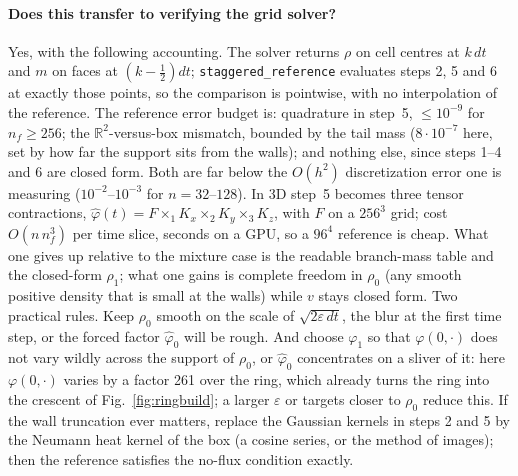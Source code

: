 \documentclass[11pt]{article}
\newcommand{\eps}{\varepsilon}
\newcommand{\code}[1]{\texttt{#1}}
\newcommand{\R}{\mathbb{R}}
\begin{document}
\paragraph{Does this transfer to verifying the grid solver?}
Yes, with the following accounting. The solver returns $\rho$ on cell centres at
$k\,dt$ and $m$ on faces at $(k-\tfrac12)dt$; \code{staggered\_reference} evaluates
steps 2, 5 and 6 at exactly those points, so the comparison is pointwise, with no
interpolation of the reference. The reference error budget is: quadrature in
step~5, $\le10^{-9}$ for $n_f\ge256$; the $\R^2$-versus-box mismatch, bounded by the
tail mass ($8\cdot10^{-7}$ here, set by how far the support sits from the walls);
and nothing else, since steps 1--4 and 6 are closed form. Both are far below the
$O(h^2)$ discretization error one is measuring ($10^{-2}$--$10^{-3}$ for
$n=32$--$128$). In 3D step~5 becomes three tensor contractions,
$\hat\varphi(t)=F\times_1K_x\times_2K_y\times_3K_z$, with $F$ on a $256^3$ grid;
cost $O(n\,n_f^3)$ per time slice, seconds on a GPU, so a $96^4$ reference is cheap.
What one gives up relative to the mixture case is the readable branch-mass table
and the closed-form $\rho_1$; what one gains is complete freedom in $\rho_0$ (any
smooth positive density that is small at the walls) while $v$ stays closed form.
Two practical rules. Keep $\rho_0$ smooth on the scale of $\sqrt{2\eps\,dt}$, the blur
at the first time step, or the forced factor $\hat\varphi_0$ will be rough. And choose
$\varphi_1$ so that $\varphi(0,\cdot)$ does not vary wildly across the support of
$\rho_0$, or $\hat\varphi_0$ concentrates on a sliver of it: here $\varphi(0,\cdot)$
varies by a factor 261 over the ring, which already turns the ring into the
crescent of Fig.~\ref{fig:ringbuild}; a larger $\eps$ or targets closer to $\rho_0$
reduce this. If the wall truncation ever matters, replace the Gaussian kernels in
steps 2 and 5 by the Neumann heat kernel of the box (a cosine series, or the method
of images); then the reference satisfies the no-flux condition exactly.
\end{document}
